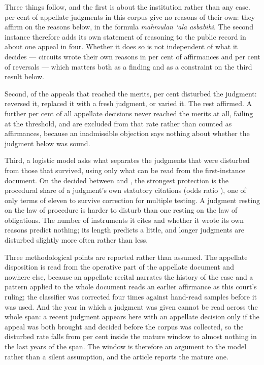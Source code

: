 \documentclass[11pt]{article}
\begin{document}
Three things follow, and the first is about the institution rather than any
case. \nNoReasonsShare{} per cent of appellate judgments in this corpus give
no reasons of their own: they affirm on the reasons below, in the formula
\emph{mahmulan `ala asbabihi}. The second instance therefore adds its own
statement of reasoning to the public record in about one appeal in four.
Whether it does so is not independent of what it decides --- circuits wrote
their own reasons in \nWroteAffirming{} per cent of affirmances and
\nWroteReversing{} per cent of reversals --- which matters both as a finding
and as a constraint on the third result below.

Second, of the appeals that reached the merits, \nDisturbedShare{} per cent
disturbed the judgment: reversed it, replaced it with a fresh judgment, or
varied it. The rest affirmed. A further \nNotAdmittedShare{} per cent of all
appellate decisions never reached the merits at all, failing at the threshold,
and are excluded from that rate rather than counted as affirmances, because an
inadmissible objection says nothing about whether the judgment below was
sound.

Third, a logistic model asks what separates the judgments that were disturbed
from those that survived, using only what can be read from the first-instance
document. On the \nModelN{} decided between \nWindowFrom{} and \nWindowTo{},
the strongest protection is the procedural share of a judgment's own
statutory citations (odds ratio \nOrProcedural{}), one of only
\nHolmSurvivors{} terms of eleven to survive correction for multiple testing.
A judgment resting on the law of procedure is harder to disturb than
one resting on the law of obligations. The number of instruments it cites and
whether it wrote its own reasons predict nothing; its length predicts a
little, and longer judgments are disturbed slightly more often rather than
less.

Three methodological points are reported rather than assumed. The appellate
disposition is read from the operative part of the appellate document and
nowhere else, because an appellate recital narrates the history of the case
and a pattern applied to the whole document reads an earlier affirmance as
this court's ruling; the classifier was corrected four times against
hand-read samples before it was used. And the year in which a judgment was
given cannot be read across the whole span: a recent judgment appears here
with an appellate decision only if the appeal was both brought and decided
before the corpus was collected, so the disturbed rate falls from
\nModelBase{} per cent inside the mature window to almost nothing in the last
years of the span. The window is therefore an argument to the model rather
than a silent assumption, and the article reports the mature one.
\end{document}
